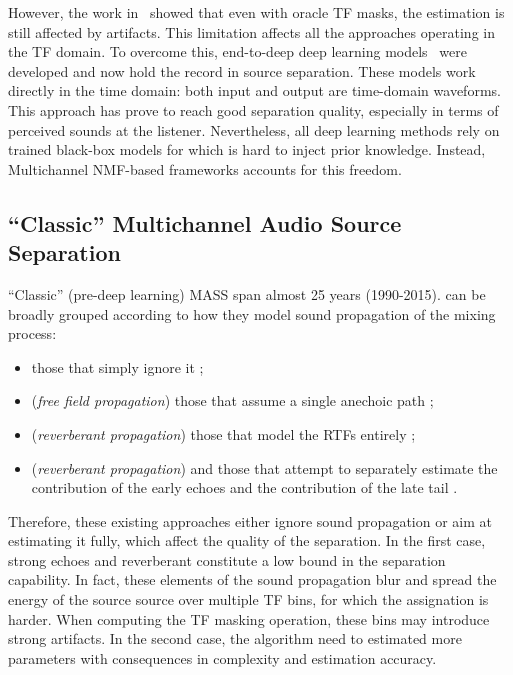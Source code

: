 \mynewline
However, the work in~ showed that even with oracle \ac{TF} masks, the estimation is still affected by artifacts.
This limitation affects all the approaches operating in the \ac{TF} domain.
To overcome this, end-to-deep deep learning models~ were developed and now hold the record in source separation.
These models work directly in the time domain: both input and output are time-domain waveforms.
This approach has prove to reach good separation quality, especially in terms of perceived sounds at the listener.
Nevertheless, all deep learning methods rely on trained black-box models for which is hard to inject prior knowledge.
Instead, Multichannel NMF-based frameworks accounts for this freedom.

\subsection{``Classic'' Multichannel Audio Source Separation}
``Classic'' (pre-deep learning) \ac{MASS} span almost 25 years (1990-2015).
 can be broadly grouped according to how they model sound propagation of the mixing process:
\begin{itemize}
    \item those that simply ignore it ;
    \item (\textit{free field propagation}) those that assume a single anechoic path  ;
    \item (\textit{reverberant propagation}) those that model the \acp{RTF} entirely ;
    \item (\textit{reverberant propagation}) and those that attempt to separately estimate the contribution of the early echoes and the contribution of the late tail .
\end{itemize}
Therefore, these existing approaches either ignore sound propagation or aim at estimating it fully, which affect the quality of the separation.
In the first case, strong echoes and reverberant constitute a low bound in the separation capability.
In fact, these elements of the sound propagation blur and spread the energy of the source source over multiple \ac{TF} bins, for which the assignation is harder.
When computing the \ac{TF} masking operation, these bins may introduce strong artifacts.
In the second case, the algorithm need to estimated more parameters with consequences in complexity and estimation accuracy.

